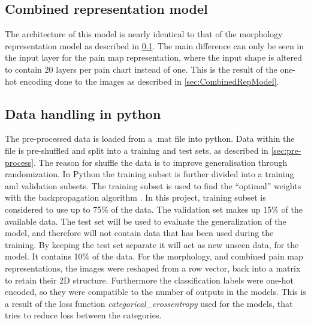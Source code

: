 
\subsection{Combined representation model}\label{sec:CombinedRepModel}
The architecture of this model is nearly identical to that of the morphology representation model as described in \ref{sec:CombinedRepModel}.
The main difference can only be seen in the input layer for the pain map representation, where the input shape is altered to contain 20 layers per pain chart instead of one. This is the result of the one-hot encoding done to the images as described in \autoref{sec:CombinedRepModel}. 


\subsection{Data handling in python}
The pre-processed data is loaded from a %
.mat file into python.
Data within the file is pre-shuffled and split into a training and test sets, as described in \autoref{sec:pre-process}. The reason for shuffle the data is to improve generalisation through randomization.
In Python the training subset is further divided into a training and validation subsets. 
The training subset is used to find the “optimal” weights with the backpropagation algorithm \citep{Bengio2012}. In this project, training subset is considered to use up to 75\% of the data. The validation set makes up 15\% of the available data.
The test set will be used to evaluate the generalization of the model, and therefore will not contain data that has been used during the training. By keeping the test set separate it will act as new unseen data, for the model. It contains 10\% of the data.
For the morphology, and combined pain map representations, the images were reshaped from a row vector, back into a matrix to retain their 2D structure.
Furthermore the classification labels were one-hot encoded, so they were compatible to the number of outputs in the models. This is a result of the loss function \textit{categorical\_crossentropy} used for the models, that tries to reduce loss between the categories.    

